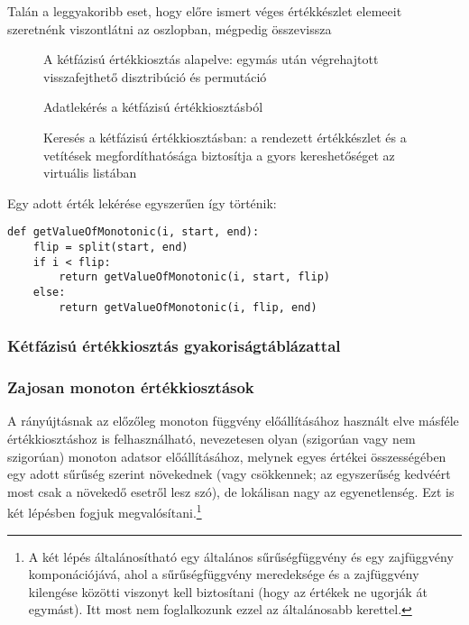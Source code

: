 \documentclass[
    parspace, %
    noindent, %
]{elteiktdk}[2023/04/10]
\begin{document}
Talán a leggyakoribb eset, hogy előre ismert véges értékkészlet elemeeit szeretnénk viszontlátni az oszlopban,
mégpedig összevissza

\begin{figure}[H]
\centering

\caption{A kétfázisú értékkiosztás alapelve: egymás után végrehajtott visszafejthető disztribúció és permutáció}
\label{A kétfázisú értékkiosztás alapelve}
\end{figure}

\begin{figure}[H]
\centering

\caption{Adatlekérés a kétfázisú értékkiosztásból}
\label{Adatlekérés a kétfázisú értékkiosztásból}
\end{figure}

\begin{figure}[H]
\centering

\caption{Keresés a kétfázisú értékkiosztásban: a rendezett értékkészlet és a vetítések megfordíthatósága biztosítja a gyors kereshetőséget az virtuális listában}
\label{Keresés a kétfázisú értékkiosztásban}
\end{figure}

Egy adott érték lekérése egyszerűen így történik:

\begin{verbatim}
def getValueOfMonotonic(i, start, end):
    flip = split(start, end)
    if i < flip:
        return getValueOfMonotonic(i, start, flip)
    else:
        return getValueOfMonotonic(i, flip, end)
\end{verbatim}


\subsubsection{Kétfázisú értékkiosztás gyakoriságtáblázattal}


\subsubsection{Zajosan monoton értékkiosztások}

A rányújtásnak az előzőleg monoton függvény előállításához használt elve
másféle értékkiosztáshoz is felhasználható,
nevezetesen olyan (szigorúan vagy nem szigorúan) monoton adatsor előállításához,
melynek egyes értékei összességében egy adott sűrűség szerint növekednek
(vagy csökkennek; az egyszerűség kedvéért most csak a növekedő esetről lesz szó),
de lokálisan nagy az egyenetlenség.
Ezt is két lépésben fogjuk megvalósítani.\footnote{
  A két lépés általánosítható egy általános sűrűségfüggvény és egy zajfüggvény komponációjává,
  ahol a sűrűségfüggvény meredeksége és a zajfüggvény kilengése közötti viszonyt kell biztosítani
  (hogy az értékek ne ugorják át egymást).
  Itt most nem foglalkozunk ezzel az általánosabb kerettel.
}
\end{document}
